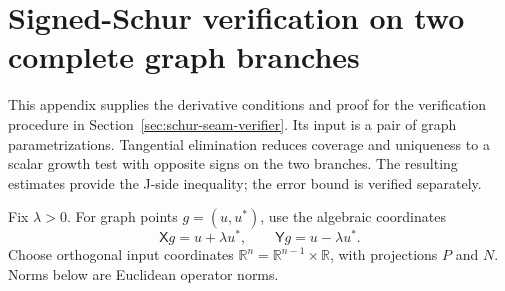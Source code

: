 \section{Signed-Schur verification on two complete graph branches}
\label{sec:signed-schur-details}

This appendix supplies the derivative conditions and proof for the
verification procedure in Section~\ref{sec:schur-seam-verifier}.  Its input is
a pair of graph parametrizations.  Tangential elimination reduces coverage
and uniqueness to a scalar growth test with opposite signs on the two
branches.  The resulting estimates provide the J-side inequality; the
error bound is verified separately.

Fix \(\lambda>0\).  For graph points \(g=(u,u^*)\), use the algebraic
coordinates
\[
 \mathsf Xg=u+\lambda u^*,\qquad
 \mathsf Yg=u-\lambda u^*.
\]
Choose orthogonal input coordinates
\(\mathbb R^n=\mathbb R^{n-1}\times\mathbb R\), with projections
\(P\) and \(N\).  Norms below are Euclidean operator norms.

